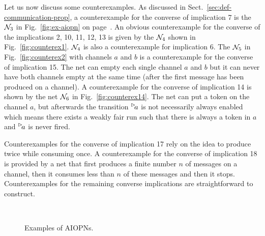 Let us now discuss some counterexamples.  As discussed in Sect.~\ref{sec:def-communication-prop}, a counterexample for the converse of implication 7 is the \AIOPN $\mathcal{N}_3$ in Fig.~\ref{fig:ex-aiopn} on page~\pageref{fig:ex-aiopn}.
An obvious counterexample for the converse of the implications 2, 10, 11, 12, 13 is given by the \AIOPN $\pnN_4$ shown in Fig.~\ref{fig:counterex1}.
$\pnN_4$ is also a counterexample for implication 6.
The \AIOPN $\pnN_5$  in Fig.~\ref{fig:counterex2} with channels $a$ and $b$ is a counterexample for the converse of implication 15. The net can empty each single channel $a$ and $b$ but it can never have both channels empty at the same time
(after the first message has been produced on a channel).
A counterexample for the converse of implication 14 is shown by the net $\pnN_6$ in Fig.~\ref{fig:counterex14}. The net can put a token on the channel $a$, but afterwards the transition $\inact{a}$ is not necessarily always enabled which means there exists a weakly fair run such that there is always a token in $a$ and $\inact{a}$ is never fired.

Counterexamples for the converse of implication 17 rely on the idea to produce twice while consuming once.
A counterexample for the converse of implication 18 is provided by a net that first produces a finite number $n$ of messages on a channel, then it consumes less than $n$ of these messages and then it stops. Counterexamples for the remaining converse implications are straightforward to construct.

 
\begin{figure}[ht]
\centering
\subfloat[$\pnN_4$]{\label{fig:counterex1} }\quad
\subfloat[$\pnN_5$]{\label{fig:counterex2} }\\
\subfloat[$\pnN_6$]{\label{fig:counterex14}}
\caption{Examples of AIOPNs.}%
\label{fig:counterex}%
\end{figure}